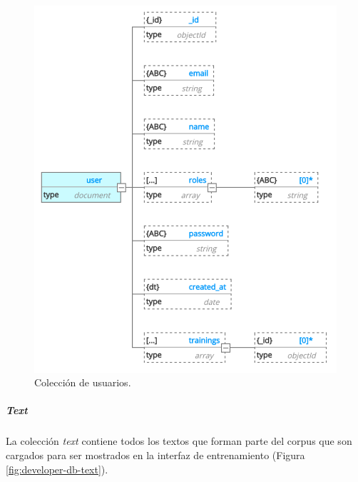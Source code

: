 \documentclass[12pt,a4paper,]{scrartcl}
\let\oldsubparagraph\subparagraph
\renewcommand{\subparagraph}[1]{\oldsubparagraph{#1}\mbox{}}
\begin{document}
\begin{figure}[H]

{\centering \includegraphics{assets/developer/db-user.pdf} 

}

\caption{Colección de usuarios.}\label{fig:developer-db-user}
\end{figure}

\hypertarget{text}{%
\subparagraph{\texorpdfstring{\emph{Text}}{Text}}\label{text}}

La colección \emph{text} contiene todos los textos que forman parte del corpus que son cargados para ser mostrados en la interfaz de entrenamiento (Figura \ref{fig:developer-db-text}).
\end{document}
